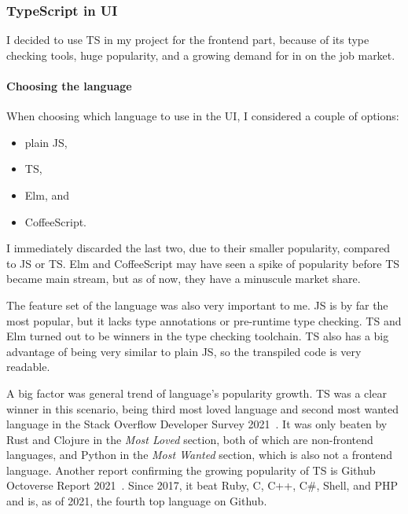 \subsubsection{TypeScript in UI}\label{sec:typescript-in-ui}

I decided to use \acl{TS} in my project for the frontend part,
because of its type checking tools,
huge popularity,
and a growing demand for in on the job market.

\paragraph{Choosing the language}\label{sec:choosing-the-language}

When choosing which language to use in the \ac{UI},
I considered a couple of options:

\begin{itemize}
  \item
        plain \acl{JS},
  \item
        \acl{TS},
  \item
        Elm, and
  \item
        CoffeeScript.
\end{itemize}

I immediately discarded the last two,
due to their smaller popularity,
compared to \acl{JS} or \acl{TS}.
Elm and CoffeeScript may have seen
a spike of popularity before \acl{TS}
became main stream,
but as of now, they have a minuscule market share.

The feature set of the language was also very important to me.
\Acl{JS} is by far the most popular,
but it lacks type annotations or pre-runtime type checking.
\Acl{TS} and Elm turned out to be winners in the type checking toolchain.
\Acl{TS} also has a big advantage of being very similar to plain \acl{JS},
so the transpiled code is very readable.

A big factor was general trend of language's popularity growth.
\Acl{TS} was a clear winner in this scenario,
being third most loved language
and second most wanted language
in the Stack Overflow Developer Survey 2021~\cite{stack_overflow_2021_2021}.
It was only beaten by Rust and Clojure
in the \textit{Most Loved} section,
both of which are non-frontend languages,
and Python in the \textit{Most Wanted} section,
which is also not a frontend language.
Another report confirming the growing popularity of \acl{TS}
is Github Octoverse Report 2021~\cite{github_inc_2021_2021}.
Since 2017,
it beat
Ruby,
C,
C++,
C\#,
Shell, and
\ac{PHP}
and is, as of 2021, the fourth top language on Github.

